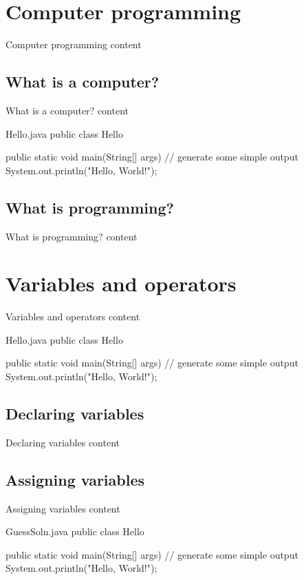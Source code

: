 \chapter{Computer programming}

Computer programming content

\section{What is a computer?}

What is a computer? content

\begin{trinket}[235]{Hello.java}
public class Hello {

    public static void main(String[] args) {
        // generate some simple output
        System.out.println("Hello, World!");
    }
}
\end{trinket}

\section{What is programming?}

What is programming? content

\chapter{Variables and operators}

Variables and operators content

\begin{trinket}{Hello.java}
public class Hello {

    public static void main(String[] args) {
        // generate some simple output
        System.out.println("Hello, World!");
    }
}
\end{trinket}

\section{Declaring variables}

Declaring variables content

\section{Assigning variables}

Assigning variables content

\begin{trinket}[235]{GuessSoln.java}
public class Hello {

    public static void main(String[] args) {
        // generate some simple output
        System.out.println("Hello, World!");
    }
}
\end{trinket}
